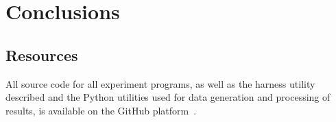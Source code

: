 \section{Conclusions}
\label{sec:conclusions}

\subsection{Resources}

All source code for all experiment programs, as well as the harness utility described and the Python utilities used for data generation and processing of results, is available on the GitHub platform~\cite{github}.
